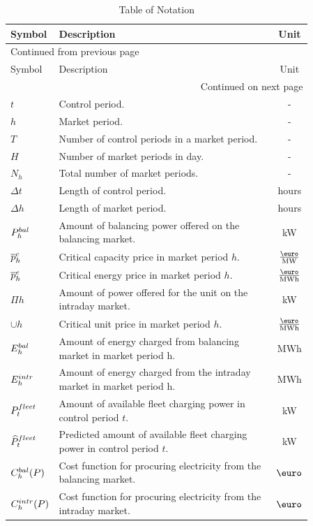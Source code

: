 \documentclass[a4paper, 12pt]{article}
\begin{document}
\begin{longtable}{p{0.11\linewidth}|p{0.75\linewidth}|c}
\caption[Table of Notation]{Table of Notation \label{table-notation}}
\\
\hline
\hline
Symbol & Description & Unit\\
\hline
\endfirsthead
\multicolumn{3}{l}{Continued from previous page} \\
\hline

Symbol & Description & Unit \\

\hline
\endhead
\hline\multicolumn{3}{r}{Continued on next page} \\
\endfoot
\endlastfoot
\hline
\(t\) & Control period. & -\\
\(h\) & Market period. & -\\
\(T\) & Number of control periods in a market period. & -\\
\(H\) & Number of market periods in day. & -\\
\(N_h\) & Total number of market periods. & -\\
\(\Delta t\) & Length of control period. & hours\\
\(\Delta h\) & Length of market period. & hours\\
\hline
\(P^{bal}_{h}\) & Amount of balancing power offered on the balancing market. & kW\\
\(\overline p^c_{h}\) & Critical capacity price in market period \(h\). & \(\emw\)\\
\(\overline p^e_{h}\) & Critical energy price in market period \(h\). & \(\emwh\)\\
\(\Pi{h}\) & Amount of power offered for the unit on the intraday market. & kW\\
\(\cup{h}\) & Critical unit price in market period \(h\). & \(\emwh\)\\
\(E^{bal}_{h}\) & Amount of energy charged from balancing market in market period h. & MWh\\
\(E^{intr}_{h}\) & Amount of energy charged from the intraday market in market period h. & MWh\\
\hline
\(P^{fleet}_{t}\) & Amount of available fleet charging power in control period \(t\). & kW\\
\(\widehat{P}^{fleet}_{t}\) & Predicted amount of available fleet charging power in control period \(t\). & kW\\
\hline
\(C^{bal}_{h}(P)\) & Cost function for procuring electricity from the balancing market. & \(\eur\)\\
\(C^{intr}_{h}(P)\) & Cost function for procuring electricity from the intraday market. & \(\eur\)\\

\end{longtable}
\end{document}
